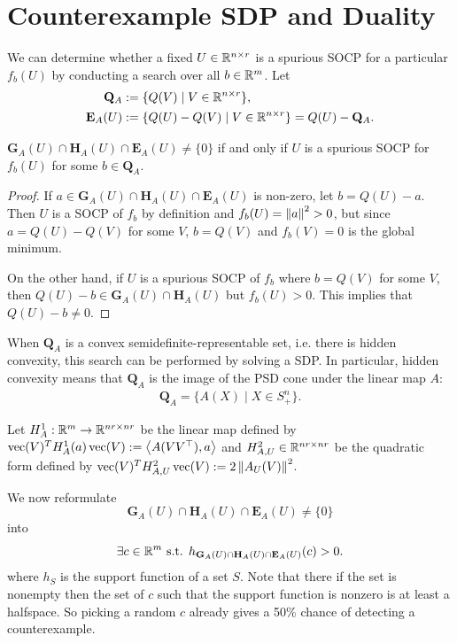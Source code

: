\documentclass[11pt]{article}
\newcommand{\suppfun}[1]{h_{#1}}
\newcommand{\Error}{\mathbf{E}_A}
\newcommand{\APsd}{\mathbf{Q}_A}
\DeclareMathOperator{\vecf}{vec}
\begin{document}
\section{Counterexample SDP and Duality}
We can determine whether a fixed $U \in \mathbb{R}^{n \times r}$ is a spurious SOCP for
a particular $f_b(U)$ by conducting a search over all $b \in \mathbb{R}^m$. Let
\begin{align*}
  \APsd &:= \{ Q(V)\mid V \in \R^{n \times r} \},\\
  \Error(U) &:= \{ Q(U) - Q(V) \mid V \in \R^{n \times r} \} = Q(U) - \APsd.
\end{align*}

\begin{proposition}
  \label{prop:onepoint}
  $\textbf{G}_A(U) \cap \textbf{H}_A(U) \cap \Error(U) \ne \{0\}$ if and
  only if $U$ is a spurious SOCP for $f_b(U)$ for some $b \in \APsd$.

  \begin{proof}
    If $a \in \textbf{G}_A(U)\cap \textbf{H}_A(U) \cap \Error(U)$ is
    non-zero, let $b = Q(U) - a$. Then $U$ is a SOCP of $f_b$ by definition and
    $f_b(U) = \left\lVert a \right\lVert^2 > 0$, but since $a = Q(U) - Q(V)$ for some $V$,
    $b = Q(V)$ and $f_b(V) = 0$ is the global minimum.

    On the other hand, if $U$ is a spurious SOCP of $f_b$ where $b = Q(V)$ for
    some $V$, then $Q(U) - b \in \textbf{G}_A(U)\cap \textbf{H}_A(U)$ but
    $f_b(U) > 0$. This implies that $Q(U) - b \ne 0$.
  \end{proof}
\end{proposition}

When $\APsd$ is a convex semidefinite-representable set, i.e. there is
hidden convexity, this search can be performed by solving a SDP. In particular,
hidden convexity means that $\APsd$ is the image of the PSD cone under
the linear map $A$:
\begin{align*}
  \APsd = \{ A(X) \mid X \in S_+^n \}.
\end{align*}

Let $H^1_A: \mathbb{R}^m \rightarrow \mathbb{R}^{nr \times nr}$ be the linear map defined by
$\vecf(V)^T H^1_A(a) \vecf(V) := \dotp{A(VV^\top), a}$ and
$H^2_{A, U} \in \mathbb{R}^{nr \times nr}$ be the quadratic form defined by
$\vecf(V)^T H^2_{A, U} \vecf(V) := 2\norm{A_U(V)}^2$.

We now reformulate
\[ \textbf{G}_A(U) \cap \textbf{H}_A(U) \cap \Error(U) \ne \{0\} \]
into
\[ \exists c \in \R^m \text{ s.t. } \suppfun{\textbf{G}_A(U) \cap \textbf{H}_A(U) \cap \Error(U)}(c) > 0. \]
where $\suppfun{S}$ is the support function of a set $S$.
Note that there if the set is nonempty then the set of $c$ such that the support function is nonzero is
at least a halfspace.
So picking a random $c$ already gives a 50\% chance of detecting a counterexample.
\end{document}
